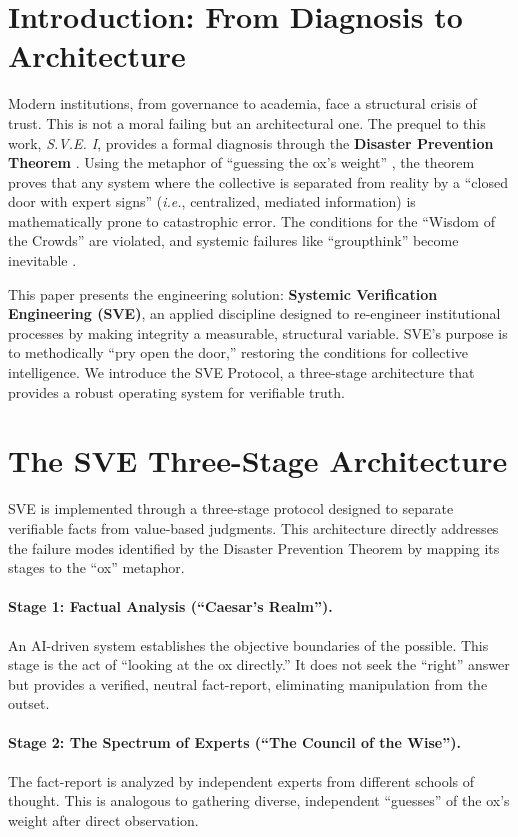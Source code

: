 \documentclass[11pt,a4paper]{article}
\theoremstyle{definition}
\begin{document}
\begin{small}
\section{Introduction: From Diagnosis to Architecture}

Modern institutions, from governance to academia, face a structural crisis of trust. This is not a moral failing but an architectural one. The prequel to this work, \emph{S.V.E. I}, provides a formal diagnosis through the \textbf{Disaster Prevention Theorem} \citep{Kovnatsky2025SVE1}. Using the metaphor of ``guessing the ox's weight'' \citep{Galton1907}, the theorem proves that any system where the collective is separated from reality by a ``closed door with expert signs'' (\emph{i.e.}, centralized, mediated information) is mathematically prone to catastrophic error. The conditions for the ``Wisdom of the Crowds'' are violated, and systemic failures like ``groupthink'' become inevitable \citep{Surowiecki2004}.

This paper presents the engineering solution: \textbf{Systemic Verification Engineering (SVE)}, an applied discipline designed to re-engineer institutional processes by making integrity a measurable, structural variable. SVE's purpose is to methodically ``pry open the door,'' restoring the conditions for collective intelligence. We introduce the SVE Protocol, a three-stage architecture that provides a robust operating system for verifiable truth.

\section{The SVE Three-Stage Architecture}

SVE is implemented through a three-stage protocol designed to separate verifiable facts from value-based judgments. This architecture directly addresses the failure modes identified by the Disaster Prevention Theorem by mapping its stages to the ``ox'' metaphor.

\paragraph{Stage 1: Factual Analysis (``Caesar's Realm'').} An AI-driven system establishes the objective boundaries of the possible. This stage is the act of ``looking at the ox directly.'' It does not seek the ``right'' answer but provides a verified, neutral fact-report, eliminating manipulation from the outset.

\paragraph{Stage 2: The Spectrum of Experts (``The Council of the Wise'').} The fact-report is analyzed by independent experts from different schools of thought. This is analogous to gathering diverse, independent ``guesses'' of the ox's weight after direct observation.


\end{small}
\end{document}
